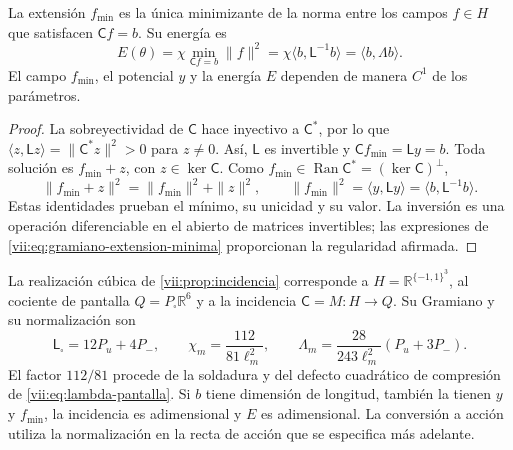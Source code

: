 \begin{proposition}
\label{vii:prop:minimo-parametrizado}
La extensión \(f_{\min}\) es la única minimizante de la norma entre
los campos \(f\in H\) que satisfacen \(\mathsf C f=b\). Su energía es
\begin{equation}
 E(\theta)=\chi\min_{\mathsf C f=b}\|f\|^2
 =\chi\langle b,\mathsf L^{-1}b\rangle
 =\langle b,\Lambda b\rangle.
 \label{vii:eq:energia-extension-minima}
\end{equation}
El campo \(f_{\min}\), el potencial \(y\) y la energía \(E\)
dependen de manera \(C^1\) de los parámetros.
\end{proposition}

\begin{proof}
La sobreyectividad de \(\mathsf C\) hace inyectivo a \(\mathsf C^*\),
por lo que \(\langle z,\mathsf Lz\rangle=\|\mathsf C^*z\|^2>0\)
para \(z\ne0\). Así, \(\mathsf L\) es invertible y
\(\mathsf C f_{\min}=\mathsf L y=b\). Toda solución es
\(f_{\min}+z\), con \(z\in\ker\mathsf C\). Como
\(f_{\min}\in\operatorname{Ran}\mathsf C^*=(\ker\mathsf C)^\perp\),
\[
 \|f_{\min}+z\|^2=\|f_{\min}\|^2+\|z\|^2,
 \qquad
 \|f_{\min}\|^2=\langle y,\mathsf L y\rangle
 =\langle b,\mathsf L^{-1}b\rangle.
\]
Estas identidades prueban el mínimo, su unicidad y su valor. La inversión
es una operación diferenciable en el abierto de matrices invertibles;
las expresiones de \eqref{vii:eq:gramiano-extension-minima} proporcionan
la regularidad afirmada.
\end{proof}

La realización cúbica de \ref{vii:prop:incidencia} corresponde a
\(H=\mathbb R^{\{-1,1\}^3}\), al cociente de pantalla
\(Q=P_\square\mathbb R^6\) y a la incidencia \(\mathsf C=M:H\to Q\).
Su Gramiano y su normalización son
\begin{equation}
 \mathsf L_\square=12P_u+4P_-,\qquad
 \chi_m=\frac{112}{81\ell_m^2},\qquad
 \Lambda_m=\frac{28}{243\ell_m^2}(P_u+3P_-).
 \label{vii:eq:normalizacion-minimo-cubico}
\end{equation}
El factor \(112/81\) procede de la soldadura y del defecto cuadrático
de compresión de \eqref{vii:eq:lambda-pantalla}. Si \(b\) tiene dimensión
de longitud, también la tienen \(y\) y \(f_{\min}\), la incidencia es
adimensional y \(E\) es adimensional. La conversión a acción utiliza
la normalización en la recta de acción que se especifica más adelante.

